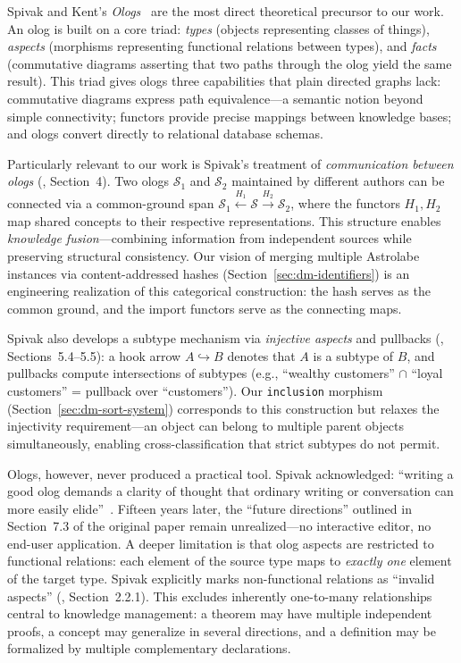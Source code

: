 Spivak and Kent's \emph{Ologs}~\cite{Spivak2012} are the most direct theoretical precursor to our work. An olog is built on a core triad: \emph{types} (objects representing classes of things), \emph{aspects} (morphisms representing functional relations between types), and \emph{facts} (commutative diagrams asserting that two paths through the olog yield the same result). This triad gives ologs three capabilities that plain directed graphs lack: commutative diagrams express path equivalence---a semantic notion beyond simple connectivity; functors provide precise mappings between knowledge bases; and ologs convert directly to relational database schemas.

Particularly relevant to our work is Spivak's treatment of \emph{communication between ologs} (\cite{Spivak2012}, Section~4). Two ologs $\mathcal{S}_1$ and $\mathcal{S}_2$ maintained by different authors can be connected via a common-ground span $\mathcal{S}_1 \xleftarrow{H_1} \mathcal{S} \xrightarrow{H_2} \mathcal{S}_2$, where the functors $H_1, H_2$ map shared concepts to their respective representations. This structure enables \emph{knowledge fusion}---combining information from independent sources while preserving structural consistency. Our vision of merging multiple Astrolabe instances via content-addressed hashes (Section~\ref{sec:dm-identifiers}) is an engineering realization of this categorical construction: the hash serves as the common ground, and the import functors serve as the connecting maps.

Spivak also develops a subtype mechanism via \emph{injective aspects} and pullbacks (\cite{Spivak2012}, Sections~5.4--5.5): a hook arrow $A \hookrightarrow B$ denotes that $A$ is a subtype of $B$, and pullbacks compute intersections of subtypes (e.g., ``wealthy customers'' $\cap$ ``loyal customers'' = pullback over ``customers''). Our \texttt{inclusion} morphism (Section~\ref{sec:dm-sort-system}) corresponds to this construction but relaxes the injectivity requirement---an object can belong to multiple parent objects simultaneously, enabling cross-classification that strict subtypes do not permit.

Ologs, however, never produced a practical tool. Spivak acknowledged: ``writing a good olog demands a clarity of thought that ordinary writing or conversation can more easily elide''~\cite{Spivak2012}. Fifteen years later, the ``future directions'' outlined in Section~7.3 of the original paper remain unrealized---no interactive editor, no end-user application. A deeper limitation is that olog aspects are restricted to functional relations: each element of the source type maps to \emph{exactly one} element of the target type. Spivak explicitly marks non-functional relations as ``invalid aspects'' (\cite{Spivak2012}, Section~2.2.1). This excludes inherently one-to-many relationships central to knowledge management: a theorem may have multiple independent proofs, a concept may generalize in several directions, and a definition may be formalized by multiple complementary declarations.

